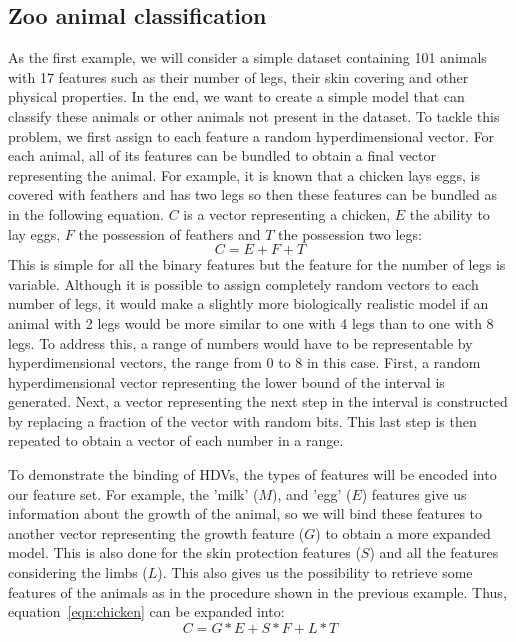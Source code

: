 \subsection{Zoo animal classification}
As the first example, we will consider a simple dataset\cite{zoo} containing 101 animals with 17 features such as their number of legs, their skin covering and other physical properties. In the end, we want to create a simple model that can classify these animals or other animals not present in the dataset. To tackle this problem, we first assign to each feature a random hyperdimensional vector. For each animal, all of its features can be bundled to obtain a final vector representing the animal. For example, it is known that a chicken lays eggs, is covered with feathers and has two legs so then these features can be bundled as in the following equation. $C$ is a vector representing a chicken, $E$ the ability to lay eggs, $F$ the possession of feathers and $T$ the possession two legs:
\begin{equation}\label{eqn:chicken}
    C = E + F + T
\end{equation}
This is simple for all the binary features but the feature for the number of legs is variable. Although it is possible to assign completely random vectors to each number of legs, it would make a slightly more biologically realistic model if an animal with 2 legs would be more similar to one with 4 legs than to one with 8 legs. To address this, a range of numbers would have to be representable by hyperdimensional vectors, the range from 0 to 8 in this case. First, a random hyperdimensional vector representing the lower bound of the interval is generated. Next, a vector representing the next step in the interval is constructed by replacing a fraction of the vector with random bits. This last step is then repeated to obtain a vector of each number in a range.

To demonstrate the binding of HDVs, the types of features will be encoded into our feature set. For example, the 'milk' ($M$), and 'egg' ($E$) features give us information about the growth of the animal, so we will bind these features to another vector representing the growth feature ($G$) to obtain a more expanded model. This is also done for the skin protection features ($S$) and all the features considering the limbs ($L$). This also gives us the possibility to retrieve some features of the animals as in the procedure shown in the previous example. Thus, equation~\ref{eqn:chicken} can be expanded into:
\begin{equation}
    C = G*E + S*F + L*T
\end{equation}

